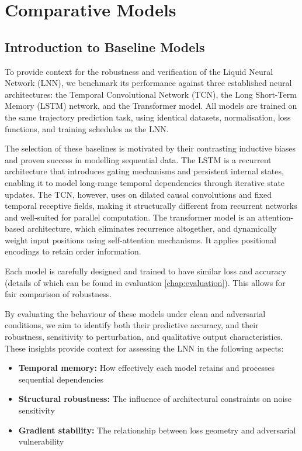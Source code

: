 \chapter{Comparative Models}

\section{Introduction to Baseline Models}

To provide context for the robustness and verification of the Liquid Neural Network (LNN), we benchmark its performance against three established neural architectures: the Temporal Convolutional Network (TCN), the Long Short-Term Memory (LSTM) network, and the Transformer model. All models are trained on the same trajectory prediction task, using identical datasets, normalisation, loss functions, and training schedules as the LNN.

The selection of these baselines is motivated by their contrasting inductive biases and proven success in modelling sequential data. The LSTM is a recurrent architecture that introduces gating mechanisms and persistent internal states, enabling it to model long-range temporal dependencies through iterative state updates. The TCN, however, uses on dilated causal convolutions and fixed temporal receptive fields, making it structurally different from recurrent networks and well-suited for parallel computation. The transformer model is an attention-based architecture, which eliminates recurrence altogether, and dynamically weight input positions using self-attention mechanisms. It applies positional encodings to retain order information.

Each model is carefully designed and trained to have similar loss and accuracy (details of which can be found in evaluation \ref{chap:evaluation}). This allows for fair comparison of robustness.

By evaluating the behaviour of these models under clean and adversarial conditions, we aim to identify both their predictive accuracy, and their robustness, sensitivity to perturbation, and qualitative output characteristics. These insights provide context for assessing the LNN in the following aspects:

\begin{itemize}
    \item \textbf{Temporal memory:} How effectively each model retains and processes sequential dependencies
    \item \textbf{Structural robustness:} The influence of architectural constraints on noise sensitivity
    \item \textbf{Gradient stability:} The relationship between loss geometry and adversarial vulnerability
\end{itemize}


